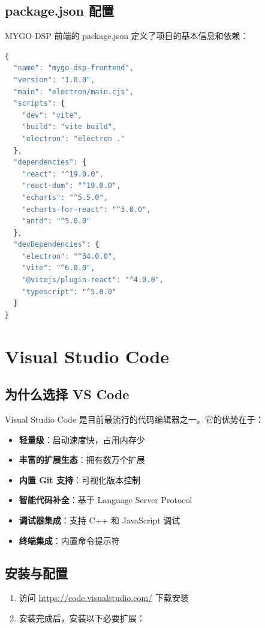 ﻿\documentclass[12pt,a4paper,oneside]{ctexbook}
\begin{document}
\subsection{package.json 配置}

MYGO-DSP 前端的 package.json 定义了项目的基本信息和依赖：

\begin{lstlisting}[language=JavaScript, caption={frontend/package.json 配置}]
{
  "name": "mygo-dsp-frontend",
  "version": "1.0.0",
  "main": "electron/main.cjs",
  "scripts": {
    "dev": "vite",
    "build": "vite build",
    "electron": "electron ."
  },
  "dependencies": {
    "react": "^19.0.0",
    "react-dom": "^19.0.0",
    "echarts": "^5.5.0",
    "echarts-for-react": "^3.0.0",
    "antd": "^5.0.0"
  },
  "devDependencies": {
    "electron": "^34.0.0",
    "vite": "^6.0.0",
    "@vitejs/plugin-react": "^4.0.0",
    "typescript": "^5.0.0"
  }
}
\end{lstlisting}

\section{Visual Studio Code}

\subsection{为什么选择 VS Code}

Visual Studio Code 是目前最流行的代码编辑器之一。它的优势在于：

\begin{itemize}
    \item \textbf{轻量级}：启动速度快，占用内存少
    \item \textbf{丰富的扩展生态}：拥有数万个扩展
    \item \textbf{内置 Git 支持}：可视化版本控制
    \item \textbf{智能代码补全}：基于 Language Server Protocol
    \item \textbf{调试器集成}：支持 C++ 和 JavaScript 调试
    \item \textbf{终端集成}：内置命令提示符
\end{itemize}

\subsection{安装与配置}

\begin{enumerate}
    \item 访问 \url{https://code.visualstudio.com/} 下载安装
    \item 安装完成后，安装以下必要扩展：
\end{enumerate}
\end{document}
